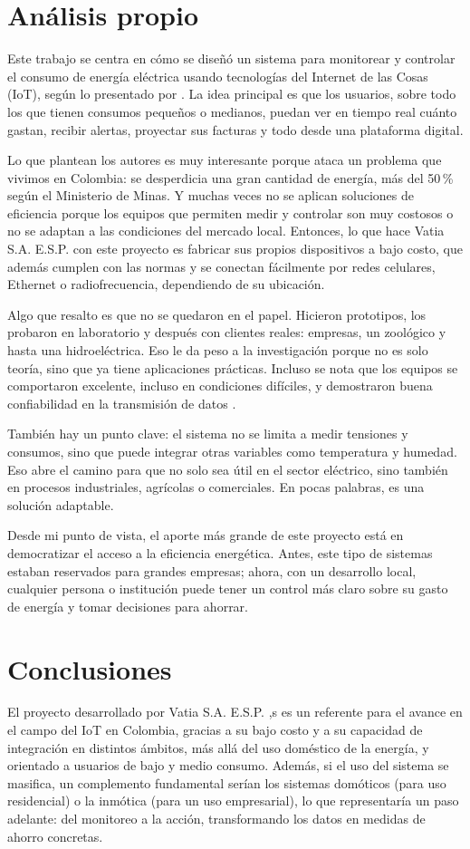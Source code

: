\section{Análisis propio}
Este trabajo se centra en cómo se diseñó un sistema para monitorear y controlar el consumo de energía eléctrica usando tecnologías del Internet de las Cosas (IoT), según lo presentado por \cite{Jaramillo2022}. La idea principal es que los usuarios, sobre todo los que tienen consumos pequeños o medianos, puedan ver en tiempo real cuánto gastan, recibir alertas, proyectar sus facturas y todo desde una plataforma digital.

Lo que plantean los autores es muy interesante porque ataca un problema que vivimos en Colombia: se desperdicia una gran cantidad de energía, más del 50\,\% según el Ministerio de Minas. Y muchas veces no se aplican soluciones de eficiencia porque los equipos que permiten medir y controlar son muy costosos o no se adaptan a las condiciones del mercado local. Entonces, lo que hace Vatia S.A. E.S.P. con este proyecto es fabricar sus propios dispositivos a bajo costo, que además cumplen con las normas y se conectan fácilmente por redes celulares, Ethernet o radiofrecuencia, dependiendo de su ubicación.

Algo que resalto es que no se quedaron en el papel. Hicieron prototipos, los probaron en laboratorio y después con clientes reales: empresas, un zoológico y hasta una hidroeléctrica. Eso le da peso a la investigación porque no es solo teoría, sino que ya tiene aplicaciones prácticas. Incluso se nota que los equipos se comportaron excelente, incluso en condiciones difíciles, y demostraron buena confiabilidad en la transmisión de datos \cite{Jaramillo2022}.

También hay un punto clave: el sistema no se limita a medir tensiones y consumos, sino que puede integrar otras variables como temperatura y humedad. Eso abre el camino para que no solo sea útil en el sector eléctrico, sino también en procesos industriales, agrícolas o comerciales. En pocas palabras, es una solución adaptable.

Desde mi punto de vista, el aporte más grande de este proyecto está en democratizar el acceso a la eficiencia energética. Antes, este tipo de sistemas estaban reservados para grandes empresas; ahora, con un desarrollo local, cualquier persona o institución puede tener un control más claro sobre su gasto de energía y tomar decisiones para ahorrar.

\section{Conclusiones}
El proyecto desarrollado por Vatia S.A. E.S.P. \cite{Eltamaly2021},s es un referente para el avance en el campo del IoT en Colombia, gracias a su bajo costo y a su capacidad de integración en distintos ámbitos, más allá del uso doméstico de la energía, y orientado a usuarios de bajo y medio consumo. Además, si el uso del sistema se masifica, un complemento fundamental serían los sistemas domóticos (para uso residencial) o la inmótica (para un uso empresarial), lo que representaría un paso adelante: del monitoreo a la acción, transformando los datos en medidas de ahorro concretas.
